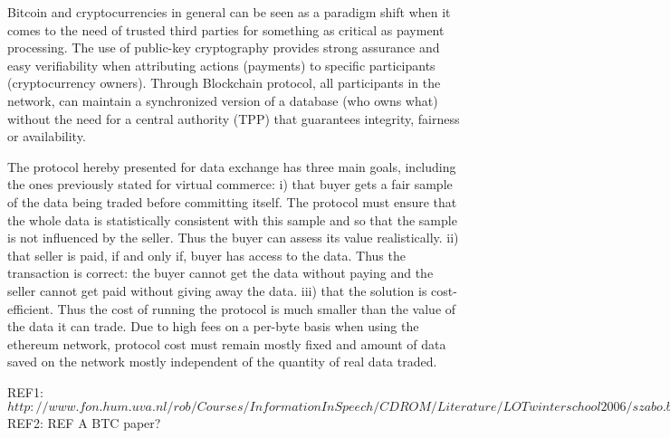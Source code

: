 \documentclass[]{article}
\begin{document}
Bitcoin and cryptocurrencies in general can be seen as a paradigm shift when it comes to the need of trusted third parties for something as critical as payment processing. The use of public-key cryptography provides strong assurance and easy verifiability when attributing actions (payments) to specific participants (cryptocurrency owners). Through Blockchain protocol, all participants in the network, can maintain a synchronized version of a database (who owns what) without the need for a central authority (TPP) that guarantees integrity, fairness or availability. 

The protocol hereby presented for data exchange has three main goals, including the ones previously stated for virtual commerce:
i) that buyer gets a fair sample of the data being traded before committing itself. The protocol must ensure that the whole data is statistically consistent with this sample and so that the sample is not influenced by the seller. Thus the buyer can assess its value realistically.
ii) that seller is paid, if and only if, buyer has access to the data. Thus the transaction is correct: the buyer cannot get the data without paying and the seller cannot get paid without giving away the data.
iii) that the solution is cost-efficient. Thus the cost of running the protocol is much smaller than the value of the data it can trade. Due to high fees on a per-byte basis when using the ethereum network, protocol cost must remain mostly fixed and amount of data saved on the network mostly independent of the quantity of real data traded.

REF1: $http://www.fon.hum.uva.nl/rob/Courses/InformationInSpeech/CDROM/Literature/LOTwinterschool2006/szabo.best.vwh.net/smart_contracts_2.html , 1996]$
REF2:
REF A BTC paper?
\end{document}
